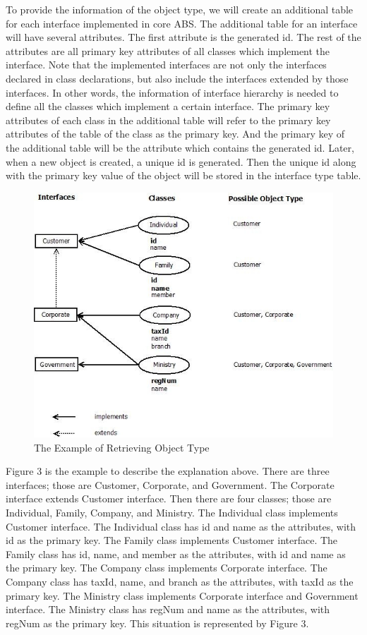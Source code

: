 \documentclass[runningheads,a4paper]{llncs}
\begin{document}
To provide the information of the object type, we will create an additional table for each interface implemented in core ABS. The additional table for an interface will have several attributes. The first attribute is the generated id. The rest of the attributes are all primary key attributes of all classes which implement the interface. Note that the implemented interfaces are not only the interfaces declared in class declarations, but also include the interfaces extended by those interfaces. In other words, the information of interface hierarchy is needed to define all the classes which implement a certain interface. The primary key attributes of each class in the additional table will refer to the primary key attributes of the table of the class as the primary key. And the primary key of the additional table will be the attribute which contains the generated id. Later, when a new object is created, a unique id is generated. Then the unique id along with the primary key value of the object will be stored in the interface type table.

\begin{figure}
	\centering
	\includegraphics[scale=0.6]{sample.jpg}
	\caption{The Example of Retrieving Object Type}
	\label{sample}
\end{figure}

Figure 3 is the example to describe the explanation above. There are three interfaces; those are Customer, Corporate, and Government. The Corporate interface extends Customer interface. Then there are four classes; those are Individual, Family, Company, and Ministry. The Individual class implements Customer interface. The Individual class has id and name as the attributes, with id as the primary key. The Family class implements Customer interface. The Family class has id, name, and member as the attributes, with id and name as the primary key. The Company class implements Corporate interface. The Company class has taxId, name, and branch as the attributes, with taxId as the primary key. The Ministry class implements Corporate interface and Government interface. The Ministry class has regNum and name as the attributes, with regNum as the primary key. This situation is represented by Figure 3. 
\end{document}
